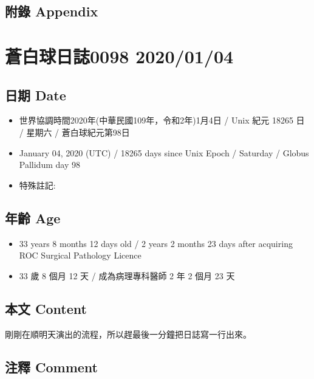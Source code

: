 \documentclass[
]{article}
\providecommand{\tightlist}{%
  \setlength{\itemsep}{0pt}\setlength{\parskip}{0pt}}
\begin{document}
\hypertarget{ux9644ux9304-appendix-2}{%
\subsection{附錄 Appendix}\label{ux9644ux9304-appendix-2}}

\hypertarget{ux84bcux767dux7403ux65e5ux8a8c0098-20200104}{%
\section{蒼白球日誌0098
2020/01/04}\label{ux84bcux767dux7403ux65e5ux8a8c0098-20200104}}

\hypertarget{ux65e5ux671f-date-3}{%
\subsection{日期 Date}\label{ux65e5ux671f-date-3}}

\begin{itemize}
\tightlist
\item
  世界協調時間2020年(中華民國109年，令和2年)1月4日 / Unix 紀元 18265 日
  / 星期六 / 蒼白球紀元第98日
\item
  January 04, 2020 (UTC) / 18265 days since Unix Epoch / Saturday /
  Globus Pallidum day 98
\item
  特殊註記:
\end{itemize}

\hypertarget{ux5e74ux9f61-age-3}{%
\subsection{年齡 Age}\label{ux5e74ux9f61-age-3}}

\begin{itemize}
\tightlist
\item
  33 years 8 months 12 days old / 2 years 2 months 23 days after
  acquiring ROC Surgical Pathology Licence
\item
  33 歲 8 個月 12 天 / 成為病理專科醫師 2 年 2 個月 23 天
\end{itemize}

\hypertarget{ux672cux6587-content-3}{%
\subsection{本文 Content}\label{ux672cux6587-content-3}}

剛剛在順明天演出的流程，所以趕最後一分鐘把日誌寫一行出來。

\hypertarget{ux6ce8ux91cb-comment-3}{%
\subsection{注釋 Comment}\label{ux6ce8ux91cb-comment-3}}
\end{document}
